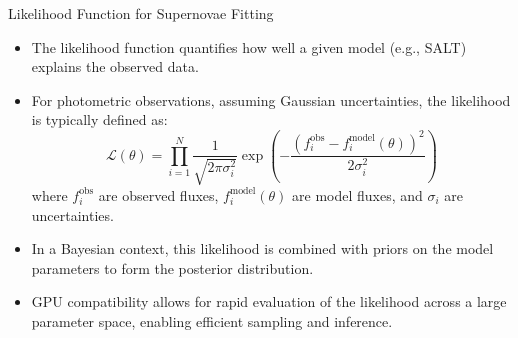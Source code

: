 \documentclass[aspectratio=169]{beamer}
\begin{document}
\begin{frame}{Likelihood Function for Supernovae Fitting}
  \begin{itemize}
    \item The likelihood function quantifies how well a given model (e.g., SALT) explains the observed data.
    \item For photometric observations, assuming Gaussian uncertainties, the likelihood is typically defined as:
      \begin{equation*}
        \mathcal{L}(\theta) = \prod_{i=1}^{N} \frac{1}{\sqrt{2\pi\sigma_i^2}} \exp\left(-\frac{(f_i^{\text{obs}} - f_i^{\text{model}}(\theta))^2}{2\sigma_i^2}\right)
      \end{equation*}
      where $f_i^{\text{obs}}$ are observed fluxes, $f_i^{\text{model}}(\theta)$ are model fluxes, and $\sigma_i$ are uncertainties.
    \item In a Bayesian context, this likelihood is combined with priors on the model parameters to form the posterior distribution.
    \item GPU compatibility allows for rapid evaluation of the likelihood across a large parameter space, enabling efficient sampling and inference.
  \end{itemize}
\end{frame}
\end{document}

